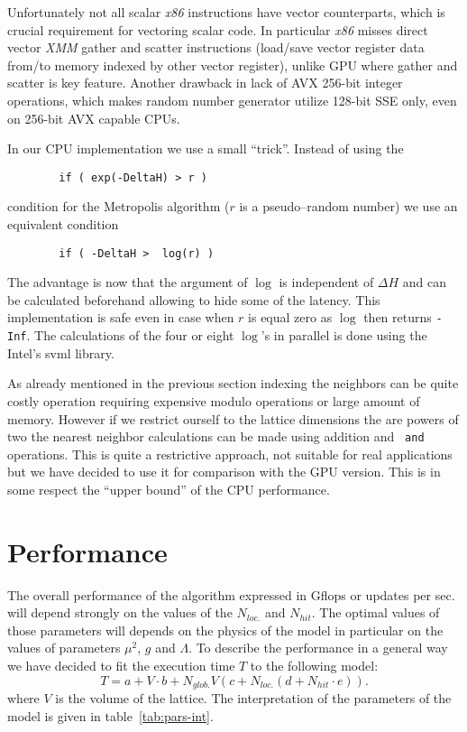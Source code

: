 \documentclass[a4paper]{llncs}
\begin{document}
Unfortunately not all scalar \emph{x86} instructions have vector counterparts,
which is crucial requirement for vectoring scalar code. In particular
\emph{x86} misses direct vector \emph{XMM} gather and scatter instructions
(load/save vector register data from/to memory indexed by other vector
register), unlike GPU where gather and scatter is key feature. Another drawback
in lack of AVX 256-bit integer operations, which makes random number generator
utilize 128-bit SSE only, even on 256-bit AVX capable CPUs.

In our CPU implementation we use a small ``trick''. Instead of using the
\begin{lstlisting}
        if ( exp(-DeltaH) > r )
\end{lstlisting}
condition for the Metropolis algorithm ($r$ is a pseudo--random number) we use
an equivalent condition
\begin{lstlisting}
        if ( -DeltaH >  log(r) )
\end{lstlisting}

The advantage is now that the argument of $\log$ is independent of
$\Delta H$ and can be calculated beforehand allowing to hide some of
the latency. This implementation is safe even in case when $r$ is
equal zero as $\log$ then returns {\tt -Inf}.  The calculations of the
four or eight $\log$'s in parallel is done using the Intel's svml
library.

As already mentioned in the previous section indexing the neighbors
can be quite costly operation requiring expensive modulo
operations or large amount of memory. However if
we restrict ourself to the lattice dimensions the are powers of two
the nearest neighbor calculations can be made using addition and {\tt
  and} operations. This is quite a restrictive approach, not suitable
for real applications but we have decided to use it for comparison
with the GPU version. This is in some respect the ``upper bound'' of
the CPU performance.


\section{Performance}
\label{sec:performance}


The overall performance of the algorithm expressed in Gflops or
updates per sec. will depend strongly on the values of the $N_{loc.}$
and $N_{hit}$. The optimal values of those parameters will depends on
the physics of the model in particular on the values of parameters
$\mu^2$, $g$ and $\Lambda$. To describe the performance in a general
way we have decided to fit the execution time $T$ to the following
model:
\begin{equation}\label{eq:model}
T  = a+ V \cdot b +
N_{glob.} V \left(c + N_{loc.}\left(d + N_{hit}\cdot e\right)\right) . 
\end{equation}
where $V$ is the volume of the lattice.  The interpretation of the
parameters of the model is given in table~\ref{tab:pars-int}.
\end{document}
